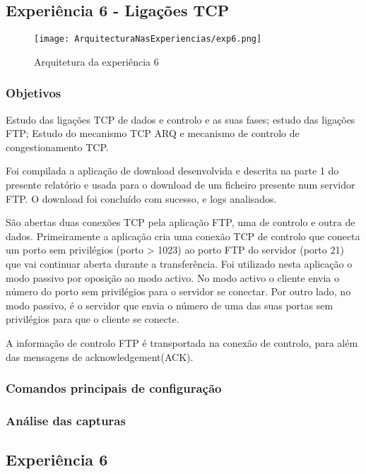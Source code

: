 \documentclass[a4paper]{article}
\begin{document}
\subsection{Experiência 6 - Ligações TCP}

\begin{figure}[h]
    \centering
    \texttt{[image: ArquitecturaNasExperiencias/exp6.png]}
    \caption{Arquitetura da experiência 6}
\end{figure}

\subsubsection{Objetivos}
Estudo das ligações TCP de dados e controlo e as suas fases; estudo das ligações FTP; Estudo do mecanismo TCP ARQ e mecanismo de controlo de congestionamento TCP.

Foi compilada a aplicação de download desenvolvida e descrita na parte 1 do presente relatório e usada para o download de um ficheiro presente num servidor FTP. O download foi concluído com sucesso, e logs analisados.

São abertas duas conexões TCP pela aplicação FTP, uma de controlo e outra de dados. Primeiramente a aplicação cria uma conexão TCP de controlo que conecta um porto sem privilégios (porto > 1023) ao porto FTP do servidor (porto 21) que vai continuar aberta durante a transferência. Foi utilizado nesta aplicação o modo passivo por oposição ao modo activo. No modo activo o cliente envia o número do porto sem privilégios para o servidor se conectar. Por outro lado, no modo passivo, é o servidor que envia o número de uma das suas portas sem privilégios para que o cliente se conecte.

A informação de controlo FTP é transportada na conexão de controlo, para além das mensagens de acknowledgement(ACK).

\subsubsection{Comandos principais de configuração}

\subsubsection{Análise das capturas}

\subsection{Experiência 6}
\end{document}
